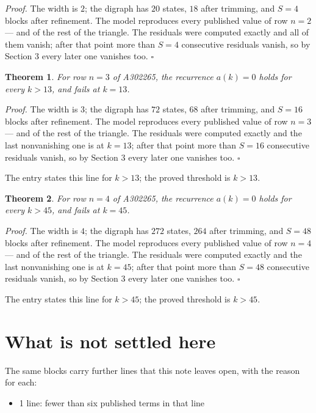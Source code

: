 \documentclass[11pt]{article}
\newtheorem{theorem}{Theorem}
\theoremstyle{definition}
\begin{document}
{\itshape Proof.} The width is $2$; the digraph has $20$ states, $18$ after trimming, and $S = 4$ blocks after refinement. The model reproduces every published value of row $n = 2$ --- and of the rest of the triangle. The residuals were computed exactly and all of them vanish; after that point more than $S = 4$ consecutive residuals vanish, so by Section 3 every later one vanishes too. $\square$

\begin{theorem} For row $n = 3$ of A302265, the recurrence $a(k) = 0$ holds for every $k > 13$, and fails at $k = 13$.\end{theorem}

{\itshape Proof.} The width is $3$; the digraph has $72$ states, $68$ after trimming, and $S = 16$ blocks after refinement. The model reproduces every published value of row $n = 3$ --- and of the rest of the triangle. The residuals were computed exactly and the last nonvanishing one is at $k = 13$; after that point more than $S = 16$ consecutive residuals vanish, so by Section 3 every later one vanishes too. $\square$

The entry states this line for $k > 13$; the proved threshold is $k > 13$.

\begin{theorem} For row $n = 4$ of A302265, the recurrence $a(k) = 0$ holds for every $k > 45$, and fails at $k = 45$.\end{theorem}

{\itshape Proof.} The width is $4$; the digraph has $272$ states, $264$ after trimming, and $S = 48$ blocks after refinement. The model reproduces every published value of row $n = 4$ --- and of the rest of the triangle. The residuals were computed exactly and the last nonvanishing one is at $k = 45$; after that point more than $S = 48$ consecutive residuals vanish, so by Section 3 every later one vanishes too. $\square$

The entry states this line for $k > 45$; the proved threshold is $k > 45$.

\section{What is not settled here}

The same blocks carry further lines that this note leaves open, with the reason for each:

\begin{itemize}

\item 1 line: fewer than six published terms in that line

\end{itemize}
\end{document}
